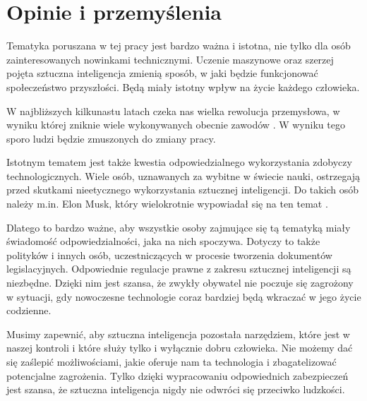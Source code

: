 \section*{Opinie i przemyślenia}
Tematyka poruszana w tej pracy jest bardzo ważna i istotna, nie tylko dla osób zainteresowanych nowinkami technicznymi. Uczenie maszynowe oraz szerzej pojęta sztuczna inteligencja zmienią sposób, w jaki będzie funkcjonować społeczeństwo przyszłości. Będą miały istotny wpływ na życie każdego człowieka. 

W najbliższych kilkunastu latach czeka nas wielka rewolucja przemysłowa, w wyniku której zniknie wiele wykonywanych obecnie zawodów \cite{czwartaRewolucja:artykul}. W wyniku tego sporo ludzi będzie zmuszonych do zmiany pracy.

Istotnym tematem jest także kwestia odpowiedzialnego wykorzystania zdobyczy technologicznych. Wiele osób, uznawanych za wybitne w świecie nauki, ostrzegają przed skutkami nieetycznego wykorzystania sztucznej inteligencji. Do takich osób należy m.in. Elon Musk, który wielokrotnie wypowiadał się na ten temat \cite{elonMusk:sztucznaInteligencja}.

Dlatego to bardzo ważne, aby wszystkie osoby zajmujące się tą tematyką miały świadomość odpowiedzialności, jaka na nich spoczywa. Dotyczy to także polityków i innych osób, uczestniczących w procesie tworzenia dokumentów legislacyjnych. Odpowiednie regulacje prawne z zakresu sztucznej inteligencji są niezbędne. Dzięki nim jest szansa, że zwykły obywatel nie poczuje się zagrożony w sytuacji, gdy nowoczesne technologie coraz bardziej będą wkraczać w jego życie codzienne.

Musimy zapewnić, aby sztuczna inteligencja pozostała narzędziem, które jest w naszej kontroli i które służy tylko i wyłącznie dobru człowieka. Nie możemy dać się zaślepić możliwościami, jakie oferuje nam ta technologia i zbagatelizować potencjalne zagrożenia. Tylko dzięki wypracowaniu odpowiednich zabezpieczeń jest szansa, że sztuczna inteligencja nigdy nie odwróci się przeciwko ludzkości.

\listoffigures